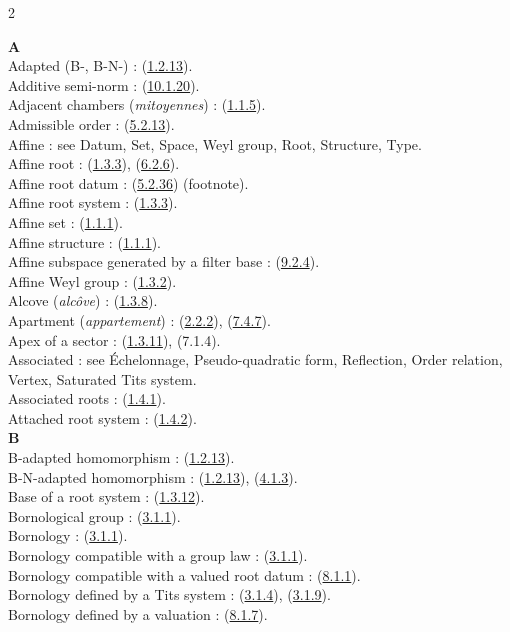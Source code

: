 \documentclass[12pt,a4paper,oneside,english]{smfart}
\newcommand{\btref}[1]{\hyperlink{bt:#1}{#1}}
\theoremstyle{definition}
\theoremstyle{bt}
\begin{document}
\medskip
\small
\begin{multicols}{2}
\raggedright
\textbf{A}\\
Adapted (B-, B-N-) : (\btref{1.2.13}).\\
Additive semi-norm : (\btref{10.1.20}).\\
Adjacent chambers (\emph{mitoyennes}) : (\btref{1.1.5}).\\
Admissible order : (\btref{5.2.13}).\\
Affine : see Datum, Set, Space, Weyl group, Root, Structure, Type.\\
Affine root : (\btref{1.3.3}), (\btref{6.2.6}).\\
Affine root datum : (\btref{5.2.36}) (footnote).\\
Affine root system : (\btref{1.3.3}).\\
Affine set : (\btref{1.1.1}).\\
Affine structure : (\btref{1.1.1}).\\
Affine subspace generated by a filter base : (\btref{9.2.4}).\\
Affine Weyl group : (\btref{1.3.2}).\\
Alcove (\emph{alcôve}) : (\btref{1.3.8}).\\
Apartment (\emph{appartement}) : (\btref{2.2.2}), (\btref{7.4.7}).\\
Apex of a sector : (\btref{1.3.11}), (7.1.4).\\
Associated : see Échelonnage, Pseudo-quadratic form, Reflection, Order relation, Vertex, Saturated Tits system.\\
Associated roots : (\btref{1.4.1}).\\
Attached root system : (\btref{1.4.2}).\\
\textbf{B}\\
B-adapted homomorphism : (\btref{1.2.13}).\\
B-N-adapted homomorphism : (\btref{1.2.13}), (\btref{4.1.3}).\\
Base of a root system : (\btref{1.3.12}).\\
Bornological group : (\btref{3.1.1}).\\
Bornology : (\btref{3.1.1}).\\
Bornology compatible with a group law : (\btref{3.1.1}).\\
Bornology compatible with a valued root datum : (\btref{8.1.1}).\\
Bornology defined by a Tits system : (\btref{3.1.4}), (\btref{3.1.9}).\\
Bornology defined by a valuation : (\btref{8.1.7}).\\

\end{multicols}
\end{document}

